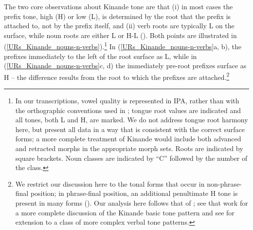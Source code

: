 The two core observations about Kinande tone are that (i)  in most cases the prefix tone, high (H) or low (L), is determined by the  root that the prefix is attached to, not by the prefix itself, and (ii) verb roots are typically L on the surface, while noun roots are either L or H-L (\citealt{Hyman+:1985, Mutaka:1994, Akinlabi+:2001}).  Both points are illustrated  in (\ref{URs_Kinande_nouns-n-verbs}).\footnote{In our transcriptions, vowel quality is represented in IPA, rather than with the orthographic conventions used in \citet{Mutaka:1994}; tongue root values are indicated and all tones, both L and H, are marked. We do not address tongue root harmony here, but present all data in a way that is consistent with the correct surface forms; a more complete treatment of Kinande would include both advanced and retracted morphs in the appropriate morph sets. Roots are indicated by square brackets. Noun classes are indicated by ``C'' followed by the number of the class.} In (\ref{URs_Kinande_nouns-n-verbs}a, b), the prefixes immediately to the left of the root surface as L, while in (\ref{URs_Kinande_nouns-n-verbs}c, d)  the immediately pre-root prefixes surface as H -- the difference results from the root to which the prefixes are attached.\footnote{We restrict our discussion here to the tonal forms that occur in non-phrase-final position; in phrase-final position, an additional penultimate H tone is present in many forms (\citealt{Hyman+:1985, Mutaka:1994}). Our analysis here follows that of \citet{Archangeli+:2015_K-tone}; see that work for  a  more complete discussion of the Kinande basic tone pattern and see \citet{Archangeli+:2014abidjan} for extension to a class of more complex verbal tone patterns.}


